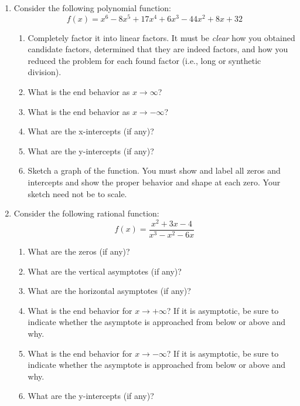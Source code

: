 \documentclass[letterpaper,12pt,fleqn]{article}
\begin{document}
\begin{enumerate}
\item Consider the following polynomial function:
\[f(x)=x^6-8x^5+17x^4+6x^3-44x^2+8x+32\]
\begin{enumerate}
\item Completely factor it into linear factors. It must be \emph{clear} how
you obtained candidate factors, determined that they are indeed factors, and
how you reduced the problem for each found factor (i.e., long or synthetic
division).
\newpage
\item What is the end behavior as $x\to\infty$?
\vspace{1in}
\item What is the end behavior as $x\to-\infty$?
\vspace{1in}
\item What are the x-intercepts (if any)?
\vspace{1in}
\item What are the y-intercepts (if any)?
\vspace{1in}
\item Sketch a graph of the function. You must show and label all zeros and
intercepts and show the proper behavior and shape at each zero.  Your sketch
need not be to scale.
\end{enumerate}
\newpage
\item Consider the following rational function:
\[f(x)=\frac{x^2+3x-4}{x^3-x^2-6x}\]
\begin{enumerate}
\item What are the zeros (if any)?
\vspace{0.5in}
\item What are the vertical asymptotes (if any)?
\vspace{0.5in}
\item What are the horizontal asymptotes (if any)?
\vspace{0.5in}
\item What is the end behavior for $x\to+\infty$? If it is asymptotic, be
sure to indicate whether the asymptote is approached from below or above and
why.
\vspace{0.5in}
\item What is the end behavior for $x\to-\infty$? If it is asymptotic, be
sure to indicate whether the asymptote is approached from below or above and
why.
\vspace{0.5in}
\item What are the y-intercepts (if any)?
\vspace{0.5in}

\end{enumerate}
\end{enumerate}
\end{document}
